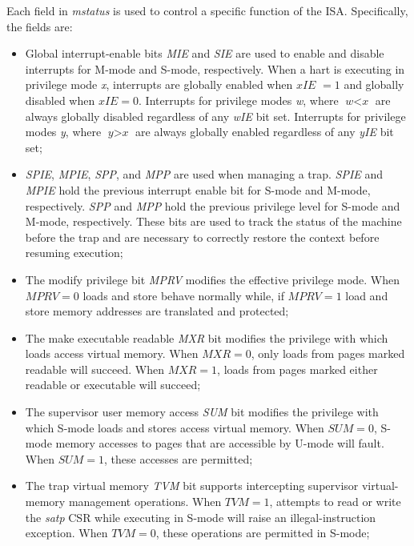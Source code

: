 Each field in \textit{mstatus} is used to control a specific function of the ISA.
Specifically, the fields are:
\begin{itemize}
  \item Global interrupt-enable bits \textit{MIE} and \textit{SIE} are used to enable
    and disable interrupts for M-mode and S-mode, respectively. When a hart is executing
    in privilege mode \textit{x}, interrupts are globally enabled when $\textit{xIE
    }= 1$ and globally disabled when $\textit{xIE}= 0$. Interrupts for privilege
    modes \textit{w}, where $\textit{w}< \textit{x}$ are always globally
    disabled regardless of any \textit{wIE} bit set. Interrupts for privilege
    modes \textit{y}, where $\textit{y}> \textit{x}$ are always globally enabled
    regardless of any \textit{yIE} bit set;

  \item \textit{SPIE}, \textit{MPIE}, \textit{SPP}, and \textit{MPP} are used
    when managing a trap. \textit{SPIE} and \textit{MPIE} hold the previous interrupt
    enable bit for S-mode and M-mode, respectively. \textit{SPP} and \textit{MPP}
    hold the previous privilege level for S-mode and M-mode, respectively. These
    bits are used to track the status of the machine before the trap and are necessary
    to correctly restore the context before resuming execution;

  \item The modify privilege bit \textit{MPRV} modifies the effective privilege
    mode. When $\textit{MPRV}= 0$ loads and store behave normally while, if
    $\textit{MPRV}= 1$ load and store memory addresses are translated and
    protected;

  \item The make executable readable \textit{MXR} bit modifies the privilege
    with which loads access virtual memory. When $\textit{MXR}=0$, only loads
    from pages marked readable will succeed. When $\textit{MXR}=1$, loads from
    pages marked either readable or executable will succeed;

  \item The supervisor user memory access \textit{SUM} bit modifies the
    privilege with which S-mode loads and stores access virtual memory. When $\textit
    {SUM}=0$, S-mode memory accesses to pages that are accessible by U-mode will
    fault. When $\textit{SUM}=1$, these accesses are permitted;

  \item The trap virtual memory \textit{TVM} bit supports intercepting
    supervisor virtual-memory management operations. When $\textit{TVM}=1$,
    attempts to read or write the \textit{satp} CSR while executing in S-mode will
    raise an illegal-instruction exception. When $\textit{TVM}=0$, these operations
    are permitted in S-mode;


\end{itemize}
